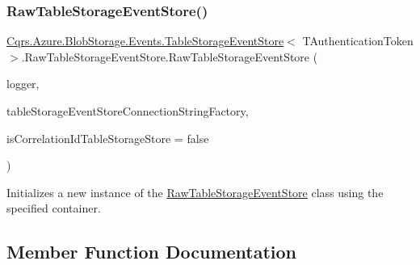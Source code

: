 \subsubsection{\texorpdfstring{Raw\+Table\+Storage\+Event\+Store()}{RawTableStorageEventStore()}}
{\footnotesize\ttfamily \hyperlink{classCqrs_1_1Azure_1_1BlobStorage_1_1Events_1_1TableStorageEventStore}{Cqrs.\+Azure.\+Blob\+Storage.\+Events.\+Table\+Storage\+Event\+Store}$<$ T\+Authentication\+Token $>$.Raw\+Table\+Storage\+Event\+Store.\+Raw\+Table\+Storage\+Event\+Store (\begin{DoxyParamCaption}\item[{I\+Logger}]{logger,  }\item[{\hyperlink{interfaceCqrs_1_1Azure_1_1BlobStorage_1_1ITableStorageStoreConnectionStringFactory}{I\+Table\+Storage\+Store\+Connection\+String\+Factory}}]{table\+Storage\+Event\+Store\+Connection\+String\+Factory,  }\item[{bool}]{is\+Correlation\+Id\+Table\+Storage\+Store = {\ttfamily false} }\end{DoxyParamCaption})}



Initializes a new instance of the \hyperlink{classCqrs_1_1Azure_1_1BlobStorage_1_1Events_1_1TableStorageEventStore_1_1RawTableStorageEventStore}{Raw\+Table\+Storage\+Event\+Store} class using the specified container. 



\subsection{Member Function Documentation}
\mbox{\label{classCqrs_1_1Azure_1_1BlobStorage_1_1Events_1_1TableStorageEventStore_1_1RawTableStorageEventStore_a916cc6bc33379535690aa0c2e7e90554_a916cc6bc33379535690aa0c2e7e90554}} 
